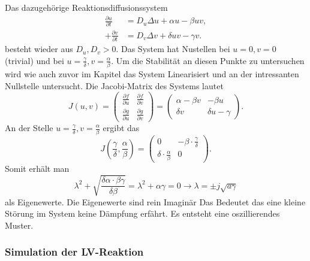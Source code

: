 Das dazugehörige Reaktionsdiffusionssystem
\begin{align}
    \frac{\partial u}{\partial t} &= D_u \Delta u + \alpha u - \beta u v, \\+
    \frac{\partial v}{\partial t} &= D_v \Delta v + \delta u v - \gamma v.
    \label{reaktdiff:equation:lvsys}
\end{align}
besteht wieder aus \(D_u,D_v > 0\).
Das System hat Nustellen bei  \(u = 0,v = 0\) (trivial) und bei \(u = \frac{\gamma}{\delta}, v = \frac{\alpha}{\beta}\).
Um die Stabilität an diesen Punkte zu untersuchen wird wie auch zuvor im Kapitel das System Linearisiert und an der intressanten Nullstelle untersucht.
Die Jacobi-Matrix des Systems lautet
\begin{equation}
        J(u,v) =
        \begin{pmatrix}
        \frac{\partial f}{\partial u} & \frac{\partial f}{\partial v} \\
        \frac{\partial g}{\partial u} & \frac{\partial g}{\partial v}
        \end{pmatrix}
        =
        \begin{pmatrix}
        \alpha - \beta v & -\beta u \\
        \delta v & \delta u - \gamma
        \end{pmatrix}.
\end{equation}
An der Stelle \(u = \frac{\gamma}{\delta}, v = \frac{\alpha}{\beta}\) ergibt das
\begin{equation}
         J(\frac{\gamma}{\delta},\frac{\alpha}{\beta}) =
        \begin{pmatrix}
        0 & -\beta \cdot\frac{\gamma}{\delta} \\
        \delta \cdot \frac{\alpha}{\beta} & 0
        \end{pmatrix}. 
\end{equation}
Somit erhält man
\begin{equation}
    \lambda^2 + \sqrt{\frac{\delta \alpha \cdot \beta \gamma}{\delta \beta}}
     = 
     \lambda^2 + \alpha \gamma = 0 
     \rightarrow
     \lambda = \pm j \sqrt{a\gamma}
\end{equation}
als Eigenewerte.
Die Eigenewerte sind rein Imaginär
Das Bedeutet das eine kleine Störung im System keine Dämpfung erfährt.
Es entsteht eine oszillierendes Muster.

\subsubsection{Simulation der LV-Reaktion}

